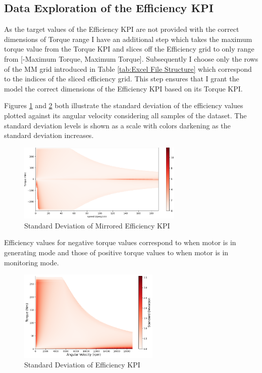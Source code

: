 \documentclass{report} %
\begin{document}
\subsection{Data Exploration of the Efficiency KPI}\label{subsec:Deep Dive into 3D KPI}
As the target values of the Efficiency \ac{KPI} are not provided with the correct dimensions of Torque range I have an additional step which takes the maximum 
torque value from the Torque \ac{KPI} and slices off the Efficiency grid to only range from [-Maximum Torque, Maximum Torque]. 
Subsequently I choose only the rows of the MM grid introduced in Table \ref{tab:Excel File Structure} which correspond to the indices of the sliced efficiency grid.
This step ensures that I grant the model the correct dimensions of the Efficiency \ac{KPI} based on its Torque \ac{KPI}.

Figures \ref{fig:Standard Deviation of Efficiency KPI(Mirrored Map)} and \ref{fig:Standard Deviation of Efficiency KPI} both illustrate the standard deviation 
of the efficiency values plotted against its angular velocity considering all samples of the dataset. The standard deviation levels is shown as a scale with colors 
darkening as the standard deviation increases.

\begin{figure}[H]
    \centering
    \includegraphics[width=0.7\textwidth]{./ReportImages/stddev_y2.png} 
    \caption{Standard Deviation of Mirrored Efficiency \ac{KPI}} 
    \label{fig:Standard Deviation of Efficiency KPI(Mirrored Map)}
\end{figure}

Efficiency values for negative torque values correspond to when motor is in generating mode and those of positive torque values to when motor is in monitoring mode.

\begin{figure}[H]
    \centering
    \includegraphics[width=0.6\textwidth]{./ReportImages/pos_stddev_y2.png} 
    \caption{Standard Deviation of Efficiency \ac{KPI}} 
    \label{fig:Standard Deviation of Efficiency KPI}
\end{figure}
\end{document}
